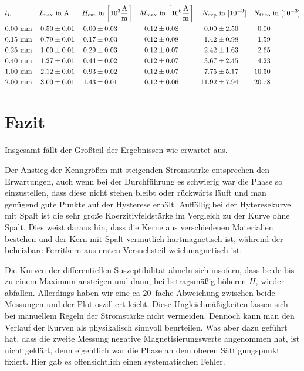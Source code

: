 \documentclass[12pt,a4paper]{scrartcl}
\numberwithin{equation}{section} %
\begin{document}
\begin{table}
\begin{align*}
	&l_L &
		I_\mathrm{max} &\text{ in } \mathrm A &
		H_\mathrm{ent} &\text{ in }
		{\tiny \left[ 10^3 \frac{\mathrm A}{\mathrm m} \right] } &
		M_\mathrm{max} &\text{ in }
		{\tiny \left[ 10^6 \frac{\mathrm A}{\mathrm m} \right] } &
		N_\mathrm{exp} &\text{ in } [10^{-3}] &
		N_\mathrm{theo} &\text{ in } [10^{-3}]
		\\
	&0.00 \ \mathrm{mm} &
		0.50 &\pm 0.01 &
		0.00 &\pm 0.03 &
		0.12 &\pm 0.08 &
		0.00 &\pm 2.50 &
		0.00\\
	&0.15 \ \mathrm{mm} &
		0.79 &\pm 0.01 &
		0.17 &\pm 0.03 &
		0.12 &\pm 0.08 &
		1.42 &\pm 0.98 &
		1.59\\
	&0.25 \ \mathrm{mm} &
		1.00 &\pm 0.01 &
		0.29 &\pm 0.03 &
		0.12 &\pm 0.07 &
		2.42 &\pm 1.63 &
		2.65\\
	&0.40 \ \mathrm{mm} &
		1.27 &\pm 0.01 &
		0.44 &\pm 0.02 &
		0.12 &\pm 0.07 &
		3.67 &\pm 2.45 &
		4.23\\
	&1.00 \ \mathrm{mm} &
		2.12 &\pm 0.01 &
		0.93 &\pm 0.02 &
		0.12 &\pm 0.07 &
		7.75 &\pm 5.17 &
		10.50\\
	&2.00 \ \mathrm{mm} &
		3.00 &\pm 0.01 &
		1.43 &\pm 0.01 &
		0.12 &\pm 0.06 &
		11.92 &\pm 7.94 &
		20.78
\end{align*}
\caption{Entmagnetisierungsfaktor}
\label{Tab: Entmagnetisierung}
\end{table}

\clearpage
\hypertarget{fazit}{%
\section{Fazit}\label{fazit}}

Insgesamt fällt der Großteil der Ergebnissen wie erwartet aus.

Der Anstieg der Kenngrößen mit steigenden Stromstärke entsprechen den Erwartungen, auch wenn bei der Durchführung es schwierig war die Phase so einzustellen, dass diese nicht stehen bleibt oder rückwärts läuft und man genügend gute Punkte auf der Hysterese erhält. Auffällig bei der Hyteresekurve mit Spalt ist die sehr große Koerzitivfeldstärke im Vergleich zu der Kurve ohne Spalt. Dies weist daraus hin, dass die Kerne aus verschiedenen Materialien bestehen und der Kern mit Spalt vermutlich hartmagnetisch ist, während der beheizbare Ferritkern aus ersten Versuchsteil weichmagnetisch ist.

Die Kurven der differentiellen Suszeptibilität ähneln sich insofern, dass beide bis zu einem Maximum ansteigen und dann, bei betragsmäßig höheren $H$, wieder abfallen. Allerdings haben wir eine ca $20$--fache Abweichung zwischen beide Messungen und der Plot oszilliert leicht. Diese Ungleichmäßigkeiten lassen sich bei manuellem Regeln der Stromstärke nicht vermeiden. Dennoch kann man den Verlauf der Kurven als physikalisch sinnvoll beurteilen. Was aber dazu geführt hat, dass die zweite Messung negative Magnetisierungswerte angenommen hat, ist nicht geklärt, denn eigentlich war die Phase an dem oberen Sättigungspunkt fixiert. Hier gab es offensichtlich einen systematischen Fehler.
\end{document}
